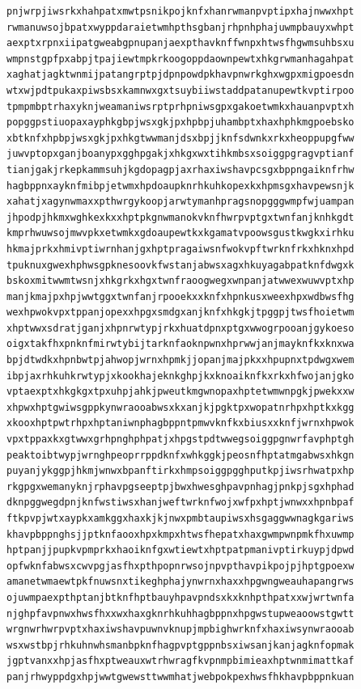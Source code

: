 \documentclass[11pt,letterpaper]{exam}
\begin{document}
\begin{questions}
\begin{verbatim}
pnjwrpjiwsrkxhahpatxmwtpsnikpojknfxhanrwmanpvptipxhajnwwxhpt
rwmanuwsojbpatxwyppdaraietwmhpthsgbanjrhpnhphajuwmpbauyxwhpt
aexptxrpnxiipatgweabgpnupanjaexpthavknffwnpxhtwsfhgwmsuhbsxu
wmpnstgpfpxabpjtpajiewtmpkrkoogoppdaownpewtxhkgrwmanhagahpat
xaghatjagktwnmijpatangrptpjdpnpowdpkhavpnwrkghxwgpxmigpoesdn
wtxwjpdtpukaxpiwsbsxkamnwxgxtsuybiiwstaddpatanupewtkvptirpoo
tpmpmbptrhaxyknjweamaniwsrptprhpniwsgpxgakoetwmkxhauanpvptxh
popggpstiuopaxayphkgbpjwsxgkjpxhpbpjuhambptxhaxhphkmgpoebsko
xbtknfxhpbpjwsxgkjpxhkgtwwmanjdsxbpjjknfsdwnkxrkxheoppupgfww
juwvptopxganjboanypxgghpgakjxhkgxwxtihkmbsxsoiggpgragvptianf
tianjgakjrkepkammsuhjkgdopagpjaxrhaxiwshavpcsgxbppngaiknfrhw
hagbppnxayknfmibpjetwmxhpdoaupknrhkuhkopexkxhpmsgxhavpewsnjk
xahatjxagynwmaxxpthwrgykoopjarwtymanhpragsnopgggwmpfwjuampan
jhpodpjhkmxwghkexkxxhptpkgnwmanokvknfhwrpvptgxtwnfanjknhkgdt
kmprhwuwsojmwvpkxetwmkxgdoaupewtkxkgamatvpoowsgustkwgkxirhku
hkmajprkxhmivptiwrnhanjgxhptpragaiwsnfwokvpftwrknfrkxhknxhpd
tpuknuxgwexhphwsgpknesoovkfwstanjabwsxagxhkuyagabpatknfdwgxk
bskoxmitwwmtwsnjxhkgrkxhgxtwnfraoogwegxwnpanjatwwexwuwvptxhp
manjkmajpxhpjwwtggxtwnfanjrpooekxxknfxhpnkusxweexhpxwdbwsfhg
wexhpwokvpxtppanjopexxhpgxsmdgxanjknfxhkgkjtpggpjtwsfhoietwm
xhptwwxsdratjganjxhpnrwtypjrkxhuatdpnxptgxwwogrpooanjgykoeso
oigxtakfhxpnknfmirwtybijtarknfaoknpwnxhprwwjanjmayknfkxknxwa
bpjdtwdkxhpnbwtpjahwopjwrnxhpmkjjopanjmajpkxxhpupnxtpdwgxwem
ibpjaxrhkuhkrwtypjxkookhajeknkghpjkxknoaiknfkxrkxhfwojanjgko
vptaexptxhkgkgxtpxuhpjahkjpweutkmgwnopaxhptetwmwnpgkjpwekxxw
xhpwxhptgwiwsgppkynwraooabwsxkxanjkjpgktpxwopatnrhpxhptkxkgg
xkooxhptpwtrhpxhptaniwnphagbppntpmwvknfkxbiusxxknfjwrnxhpwok
vpxtppaxkxgtwwxgrhpnghphpatjxhpgstpdtwwegsoiggpgnwrfavphptgh
peaktoibtwypjwrnghpeoprrppdknfxwhkggkjpeosnfhptatmgabwsxhkgn
puyanjykggpjhkmjwnwxbpanftirkxhmpsoiggpgghputkpjiwsrhwatpxhp
rkgpgxwemanyknjrphavpgseeptpjbwxhwesghpavpnhagjpnkpjsgxhphad
dknpggwegdpnjknfwstiwsxhanjweftwrknfwojxwfpxhptjwnwxxhpnbpaf
ftkpvpjwtxaypkxamkggxhaxkjkjnwxpmbtaupiwsxhsgaggwwnagkgariws
khavpbppnghsjjptknfaooxhpxkmpxhtwsfhepatxhaxgwmpwnpmkfhxuwmp
hptpanjjpupkvpmprkxhaoiknfgxwtiewtxhptpatpmanivptirkuypjdpwd
opfwknfabwsxcwvpgjasfhxpthpopnrwsojnpvpthavpikpojpjhptgpoexw
amanetwmaewtpkfnuwsnxtikeghphajynwrnxhaxxhpgwngweauhapangrws
ojuwmpaexpthptanjbtknfhptbauyhpavpndsxkxknhpthpatxxwjwrtwnfa
njghpfavpnwxhwsfhxxwxhaxgknrhkuhhagbppnxhpgwstupweaoowstgwtt
wrgnwrhwrpvptxhaxiwshavpuwnvknupjmpbighwrknfxhaxiwsynwraooab
wsxwstbpjrhkuhnwhsmanbpknfhagpvptgppnbsxiwsanjkanjagknfopmak
jgptvanxxhpjasfhxptweauxwtrhwragfkvpnmpbimieaxhptwnmimattkaf
panjrhwyppdgxhpjwwtgwewsttwwmhatjwebpokpexhwsfhkhavpbppnkuan

\end{verbatim}
\end{questions}
\end{document}
